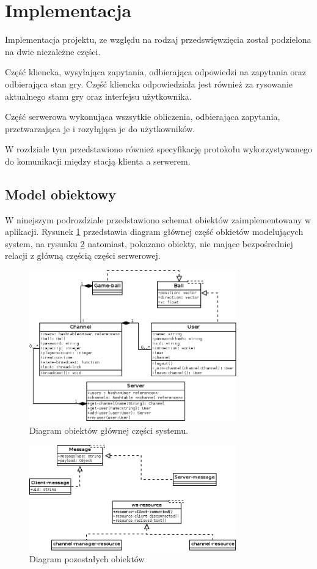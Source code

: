 \section{Implementacja}
Implementacja projektu, ze względu na rodzaj przedswięwzięcia został podzielona na dwie niezależne części.

Część kliencka, wysyłająca zapytania, odbierająca odpowiedzi na zapytania oraz odbierająca stan gry. Część kliencka odpowiedziala jest również za rysowanie aktualnego stanu gry oraz interfejsu użytkownika.

Część serwerowa wykonująca wszsytkie obliczenia, odbierająca zapytania, przetwarzająca je i rozyłąjąca je do użytkowników.

W rozdziale tym przedstawiono również specyfikację protokołu wykorzystywanego do komunikacji między stacją klienta a serwerem.

\subsection{Model obiektowy}
W ninejszym podrozdziale przedstawiono schemat obiektów zaimplementowany w aplikacji. Rysunek \ref{fig:main-obj} przedstawia diagram głównej część obkietów modelujących system, na rysunku \ref{fig:misc-obj} natomiast, pokazano obiekty, nie mające bezpośredniej relacji z główną częścią części serwerowej.
\begin{figure}[ht]
    \centering
    \includegraphics[width=0.8\textwidth]{imgs/main-obj.png}
    \caption{Diagram obiektów głównej części systemu.}
    \label{fig:main-obj}
\end{figure}

\begin{figure}[ht]
    \centering
    \includegraphics[width=0.8\textwidth]{imgs/misc-obj.png}
    \caption{Diagram pozostałych obiektów}
    \label{fig:misc-obj}
\end{figure}

